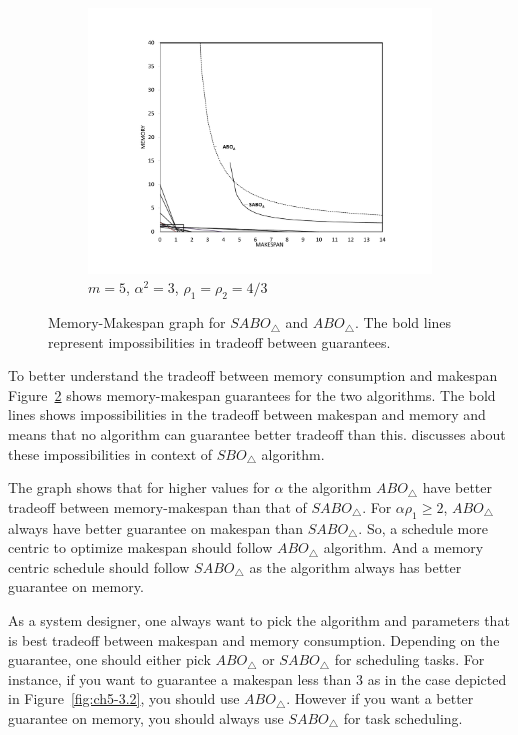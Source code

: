 \documentclass[twocolumn]{svjour3}
\begin{document}
\begin{figure}
  \begin{subfigure}[b]{0.5\textwidth}
    \includegraphics[width=\textwidth]{m5alpha3rho133.pdf}
    \caption{$m=5$, $\alpha^2=3$, $\rho_1=\rho_2=4/3$}
    \label{fig:ch5-3.3}
  \end{subfigure} %
  
  \caption{Memory-Makespan graph for $SABO_\triangle$ and
    $ABO_\triangle$. The bold lines represent impossibilities in
    tradeoff between guarantees.}
  \label{fig:ch5-3}
\end{figure}

To better understand the tradeoff between memory consumption and
makespan Figure~\ref{fig:ch5-3} shows memory-makespan guarantees for
the two algorithms.  The bold lines shows impossibilities in the
tradeoff between makespan and memory and means that no algorithm can
guarantee better tradeoff than this. \cite{10.1109/IPDPS.2008.4536292}
discusses about these impossibilities in context of $SBO_\triangle$
algorithm.
   
The graph shows that for higher values for $\alpha$ the algorithm
$ABO_\triangle$ have better tradeoff between memory-makespan than that
of $SABO_\triangle$. For $\alpha\rho_1\geq 2$, $ABO_\triangle$ always
have better guarantee on makespan than $SABO_\triangle$. So, a
schedule more centric to optimize makespan should follow
$ABO_\triangle$ algorithm. And a memory centric schedule should follow
$SABO_\triangle$ as the algorithm always has better guarantee on
memory.
   
As a system designer, one always want to pick the algorithm and
parameters that is best tradeoff between makespan and memory
consumption.  Depending on the guarantee, one should either pick
$ABO_\triangle$ or $SABO_\triangle$ for scheduling tasks.  For
instance, if you want to guarantee a makespan less than 3 as in the
case depicted in Figure~\ref{fig:ch5-3.2}, you should use
$ABO_\triangle$. However if you want a better guarantee on memory, you
should always use $SABO_\triangle$ for task scheduling.
     
\end{document}
